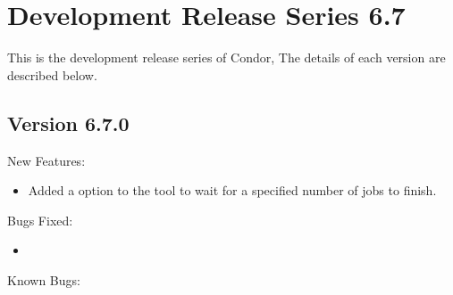 \section{\label{sec:History-6-7}Development Release Series 6.7}

This is the development release series of Condor,
The details of each version are described below.

\subsection{\label{sec:New-6-7-0}Version 6.7.0}

\noindent New Features:

\begin{itemize}

\item Added a  option to the  tool to wait for
      a specified number of jobs to finish.

\end{itemize}

\noindent Bugs Fixed:

\begin{itemize}

\item

\end{itemize}

\noindent Known Bugs:

\begin{itemize}

\end{itemize}
